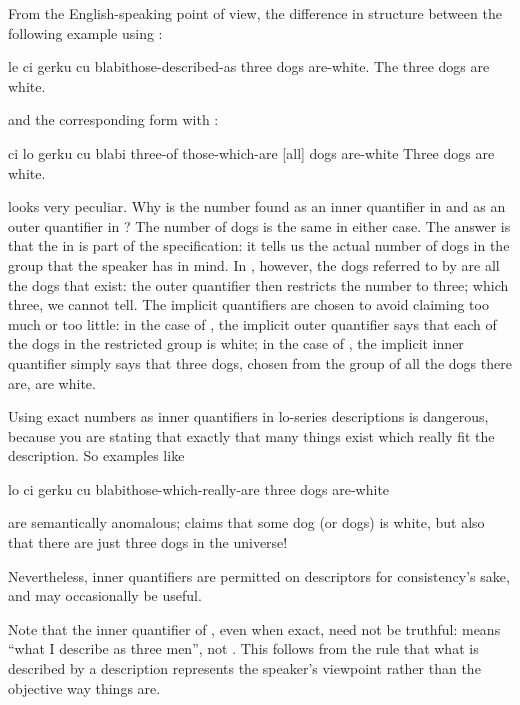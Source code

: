 From the English-speaking point of view, the difference in
    structure between the following example using :
\begin{example}
[ro] le ci gerku cu blabi\n
[all-of] those-described-as three dogs are-white.\n
The three dogs are white.
\end{example}

{\noindent}and the corresponding form with :
\begin{example}
ci lo  gerku cu blabi\n
three-of those-which-are [all] dogs are-white\n
Three dogs are white.
\end{example}

{\noindent}looks very peculiar. Why is the number  found as an inner
    quantifier in  and as an outer
    quantifier in ? The number of
    dogs is the same in either case. The answer is that the 
    in  is part of the
    specification: it tells us the actual number of dogs in the
    group that the speaker has in mind. In , however, the dogs referred to by  are
    all the dogs that exist: the outer quantifier then restricts
    the number to three; which three, we cannot tell. The implicit
    quantifiers are chosen to avoid claiming too much or too
    little: in the case of , the implicit outer quantifier
     says that each of the dogs in the restricted group is
    white; in the case of , the implicit inner quantifier
    simply says that three dogs, chosen from the group of all the
    dogs there are, are white. 

Using exact numbers as inner quantifiers in lo-series
    descriptions is dangerous, because you are stating that exactly
    that many things exist which really fit the description. So
    examples like
\begin{example}
[su'o] lo ci gerku cu blabi\n
[some-of] those-which-really-are three dogs are-white
\end{example}

{\noindent}are semantically anomalous; 
    claims that some dog (or dogs) is white, but also that there
    are just three dogs in the universe! 

Nevertheless, inner quantifiers are permitted on 
    descriptors for consistency's sake, and may occasionally be
    useful.

Note that the inner quantifier of , even when exact,
    need not be truthful:  means ``what I describe
    as three men'', not . This
    follows from the rule that what is described by a 
    description represents the speaker's viewpoint rather than the
    objective way things are.



